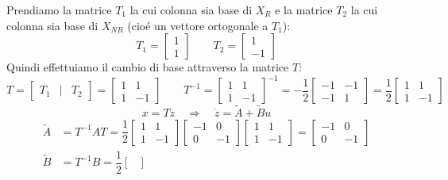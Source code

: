 \documentclass[../main.tex]{subfiles}
\begin{document}
\begin{Exercise}[title={Calcolo di $ X_R $ e decomposizione di raggiungibilit\'a}, difficulty=1]
			Prendiamo la matrice $ T_1 $ la cui colonna sia base di $ X_R $ e la matrice $ T_2 $ la cui colonna sia base di $ X_{NR} $ (cio\'e un vettore ortogonale a $ T_1 $):
			\[
				T_1=
				\begin{bmatrix}
					1\\
					1
				\end{bmatrix} \qquad
				T_2=
				\begin{bmatrix}
					1\\
					-1
				\end{bmatrix}
			\]
			Quindi effettuiamo il cambio di base attraverso la matrice $ T $:
			\[
				T =
				\begin{bmatrix}
					T_1 & | & T_2	
				\end{bmatrix} =
				\begin{bmatrix}
					1 & 1\\
					1 & -1
				\end{bmatrix}\qquad
				T^{-1} =
				\begin{bmatrix}
					1 & 1\\
					1 & -1
				\end{bmatrix}^{-1} = -\dfrac{1}{2}
				\begin{bmatrix}
					-1 & -1\\
					-1 & 1
				\end{bmatrix}= \dfrac{1}{2}
				\begin{bmatrix}
					1 & 1\\
					1 & -1
				\end{bmatrix}
			\]
			\[ x = Tz \quad\Rightarrow\quad \dot z = \tilde A + \tilde B u \]
			\begin{align*}
				\tilde A &= T^{-1}AT = \dfrac{1}{2}
				\begin{bmatrix}
					1 & 1\\
					1 & -1
				\end{bmatrix}
				\begin{bmatrix}
					-1 & 0\\
					0 & -1
				\end{bmatrix}
				\begin{bmatrix}
					1 & 1\\
					1 & -1
				\end{bmatrix} =
				\begin{bmatrix}
					-1 & 0\\
					0 & -1
				\end{bmatrix}\\
				\tilde B &= T^{-1}B = \dfrac{1}{2}
				\begin{bmatrix}

\end{bmatrix}
\end{align*}
\end{Exercise}
\end{document}
